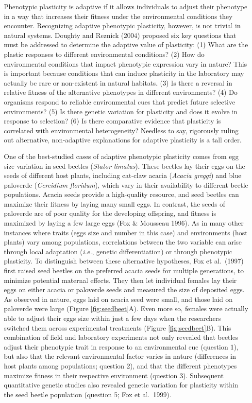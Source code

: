 \documentclass[
]{book}
\begin{document}
Phenotypic plasticity is adaptive if it allows individuals to adjust their phenotype in a way that increases their fitness under the environmental conditions they encounter. Recognizing adaptive phenotypic plasticity, however, is not trivial in natural systems. Doughty and Reznick (2004) proposed six key questions that must be addressed to determine the adaptive value of plasticity: (1) What are the plastic responses to different environmental conditions? (2) How do environmental conditions that impact phenotypic expression vary in nature? This is important because conditions that can induce plasticity in the laboratory may actually be rare or non-existent in natural habitats. (3) Is there a reversal in relative fitness of the alternative phenotypes in different environments? (4) Do organisms respond to reliable environmental cues that predict future selective environments? (5) Is there genetic variation for plasticity and does it evolve in response to selection? (6) Is there comparative evidence that plasticity is correlated with environmental heterogeneity? Needless to say, rigorously ruling out alternative, non-adaptive explanations for adaptive plasticity is a tall order.

One of the best-studied cases of adaptive phenotypic plasticity comes from egg size variation in seed beetles (\emph{Stator limatus}). These beetles lay their eggs on the seeds of different host plants, including cat-claw acacia (\emph{Acacia greggi}) and blue paloverde (\emph{Cercidium floridum}), which vary in their availability to different beetle populations. Acacia seeds provide a high-quality resource, and seed beetles can maximize their fitness by laying many small eggs. In contrast, the seeds of paloverde are of poor quality for the developing offspring, and fitness is maximized by laying a few large eggs (Fox \& Mousseau 1996). As in many other instances where traits (eggs size and number in this case) and environments (host plants) vary among populations, correlations between the two variable can arise through local adaptation (\emph{i.e.}, genetic differentiation) or through phenotypic plasticity. To distinguish between these alternative hypotheses, Fox et al.~(1997) first raised seed beetles on the preferred acacia seeds for multiple generations, to minimize potential maternal effects. They then let individual females lay their eggs on either acacia or paloverde seeds and measured the size of deposited eggs. As observed in nature, eggs laid on acacia seed were small, and those laid on paloverde were large (Figure \ref{fig:seedbeet}A). Even more so, females were actually able to adjust their eggs size within just a few days when the researchers switched them across experimental treatments (Figure \ref{fig:seedbeet}B). This combination of field and laboratory experiments not only revealed that beetles adjust their phenotypic trait in response to an environmental cue (question 1), but also that the relevant environmental factor varies in nature (differences in host plants among populations; question 2), and that the different phenotypes maximize fitness in their respective environment (question 3). Subsequent quantitative genetic studies also revealed genetic variation for plasticity within the seed beetle population (question 5; Fox et al.~1999).
\end{document}
